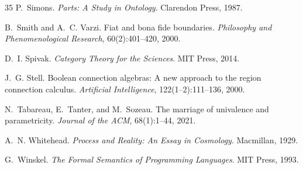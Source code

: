 \documentclass[12pt]{article}
\theoremstyle{plain}
\theoremstyle{definition}
\theoremstyle{remark}
\begin{document}
\begin{thebibliography}{35}
P.~Simons.
\newblock \emph{Parts: A Study in Ontology}.
\newblock Clarendon Press, 1987.

B.~Smith and A.~C. Varzi.
\newblock Fiat and bona fide boundaries.
\newblock \emph{Philosophy and Phenomenological Research},
  60(2):401--420, 2000.

D.~I. Spivak.
\newblock \emph{Category Theory for the Sciences}.
\newblock MIT Press, 2014.

J.~G. Stell.
\newblock Boolean connection algebras: A new approach to the region connection
  calculus.
\newblock \emph{Artificial Intelligence}, 122(1--2):111--136, 2000.

N.~Tabareau, E.~Tanter, and M.~Sozeau.
\newblock The marriage of univalence and parametricity.
\newblock \emph{Journal of the {ACM}}, 68(1):1--44, 2021.

A.~N. Whitehead.
\newblock \emph{Process and Reality: An Essay in Cosmology}.
\newblock Macmillan, 1929.

G.~Winskel.
\newblock \emph{The Formal Semantics of Programming Languages}.
\newblock MIT Press, 1993.

\end{thebibliography}
\end{document}
